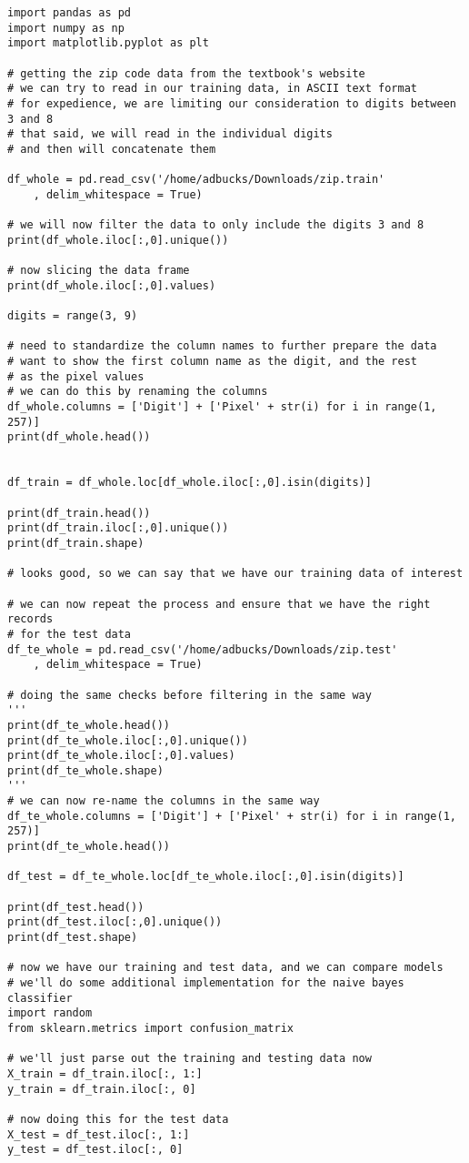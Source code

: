 \documentclass[12pt, letterpaper]{article}
\begin{document}
\begin{verbatim}
import pandas as pd 
import numpy as np 
import matplotlib.pyplot as plt 

# getting the zip code data from the textbook's website 
# we can try to read in our training data, in ASCII text format
# for expedience, we are limiting our consideration to digits between 3 and 8 
# that said, we will read in the individual digits
# and then will concatenate them 

df_whole = pd.read_csv('/home/adbucks/Downloads/zip.train'
	, delim_whitespace = True)

# we will now filter the data to only include the digits 3 and 8 
print(df_whole.iloc[:,0].unique())

# now slicing the data frame
print(df_whole.iloc[:,0].values)

digits = range(3, 9)

# need to standardize the column names to further prepare the data 
# want to show the first column name as the digit, and the rest 
# as the pixel values 
# we can do this by renaming the columns 
df_whole.columns = ['Digit'] + ['Pixel' + str(i) for i in range(1, 257)]
print(df_whole.head())


df_train = df_whole.loc[df_whole.iloc[:,0].isin(digits)]

print(df_train.head()) 
print(df_train.iloc[:,0].unique())
print(df_train.shape)

# looks good, so we can say that we have our training data of interest

# we can now repeat the process and ensure that we have the right records
# for the test data 
df_te_whole = pd.read_csv('/home/adbucks/Downloads/zip.test'
	, delim_whitespace = True)

# doing the same checks before filtering in the same way 
'''
print(df_te_whole.head())
print(df_te_whole.iloc[:,0].unique())
print(df_te_whole.iloc[:,0].values)
print(df_te_whole.shape)
'''
# we can now re-name the columns in the same way 
df_te_whole.columns = ['Digit'] + ['Pixel' + str(i) for i in range(1, 257)]
print(df_te_whole.head()) 

df_test = df_te_whole.loc[df_te_whole.iloc[:,0].isin(digits)]

print(df_test.head())
print(df_test.iloc[:,0].unique())
print(df_test.shape)

# now we have our training and test data, and we can compare models 
# we'll do some additional implementation for the naive bayes classifier 
import random 
from sklearn.metrics import confusion_matrix 

# we'll just parse out the training and testing data now 
X_train = df_train.iloc[:, 1:]
y_train = df_train.iloc[:, 0]

# now doing this for the test data 
X_test = df_test.iloc[:, 1:]
y_test = df_test.iloc[:, 0]
\end{verbatim}
\end{document}
